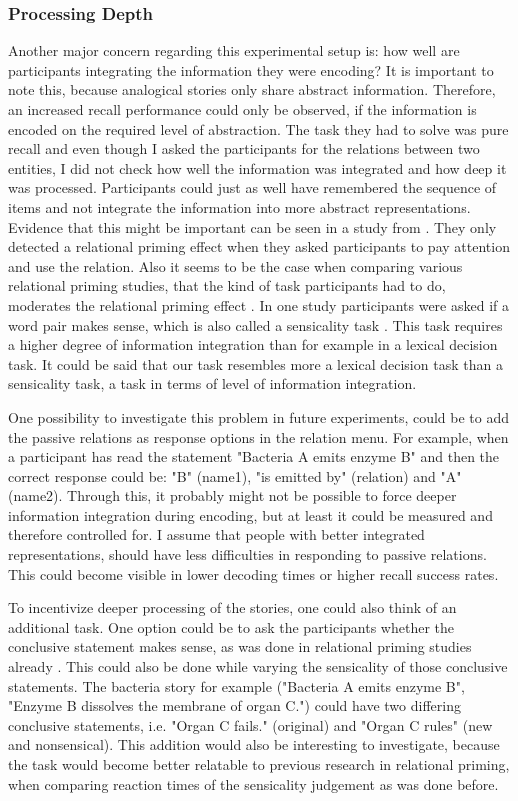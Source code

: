 \documentclass[a4paper,man,natbib,floatsintext,import]{apa6}
\begin{document}
\subsubsection{Processing Depth}
Another major concern regarding this experimental setup is: how well are participants integrating the information they were encoding? It is important to note this, because analogical stories only share abstract information. Therefore, an increased recall performance could only be observed, if the information is encoded on the required level of abstraction. The task they had to solve was pure recall and even though I asked the participants for the relations between two entities, I did not check how well the information was integrated and how deep it was processed. Participants could just as well have remembered the sequence of items and not integrate the information into more abstract representations. Evidence that this might be important can be seen in a study from \cite{Spellman2001}. They only detected a relational priming effect when they asked participants to pay attention and use the relation. Also it seems to be the case when comparing various relational priming studies, that the kind of task participants had to do, moderates the relational priming effect \citep{Popov2015}. In one study participants were asked if a word pair makes sense, which is also called a sensicality task \citep{Estes2006}. This task requires a higher degree of information integration than for example in a lexical decision task. It could be said that our task resembles more a lexical decision task than a sensicality task, a task  in terms of level of information integration.

One possibility to investigate this problem in future experiments, could be to add the passive relations as response options in the relation menu. For example, when a participant has read the statement "Bacteria A emits enzyme B" and then the correct response could be: "B" (name1), "is emitted by" (relation) and "A" (name2).
Through this, it probably might not be possible to force deeper information integration during encoding, but at least it could be measured and therefore controlled for. I assume that people with better integrated representations, should have less difficulties in responding to passive relations. This could become visible in lower decoding times or higher recall success rates.

To incentivize deeper processing of the stories, one could also think of an additional task. One option could be to ask the participants whether the conclusive statement makes sense, as was done in relational priming studies already \citep{Estes2006,Popov2015}. This could also be done while varying the sensicality of those conclusive statements. The bacteria story for example ("Bacteria A emits enzyme B", "Enzyme B dissolves the membrane of organ C.") could have two differing conclusive statements, i.e. "Organ C fails." (original) and "Organ C rules" (new and nonsensical). This addition would also be interesting to investigate, because the task would become better relatable to previous research in relational priming, when comparing reaction times of the sensicality judgement as was done before.
\end{document}
